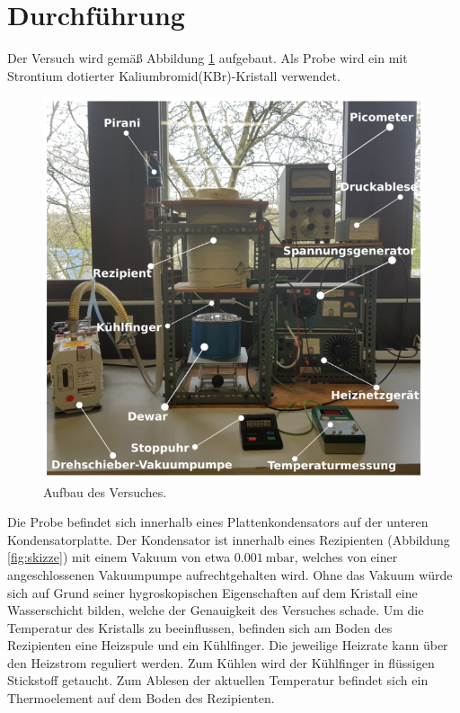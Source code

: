 \section{Durchführung}
\label{sec:Durchführung}

Der Versuch wird gemäß Abbildung \ref{fig:aufbau} aufgebaut. Als Probe wird ein mit Strontium dotierter Kaliumbromid(KBr)-Kristall verwendet.

\begin{figure}
    \centering
    \includegraphics[width=\textwidth]{Bilder/Aufbau.PNG}
    \caption{Aufbau des Versuches.}
    \label{fig:aufbau}
\end{figure}

Die Probe befindet sich innerhalb eines Plattenkondensators auf der unteren Kondensatorplatte. Der Kondensator ist innerhalb eines Rezipienten (Abbildung \ref{fig:skizze}) mit einem Vakuum von etwa $\SI{0.001}{\milli\bar}$, welches von einer angeschlossenen Vakuumpumpe aufrechtgehalten wird. Ohne das Vakuum würde sich auf Grund seiner hygroskopischen Eigenschaften auf dem Kristall eine Wasserschicht bilden, welche der Genauigkeit des Versuches schade.
Um die Temperatur des Kristalls zu beeinflussen, befinden sich am Boden des Rezipienten eine Heizspule und ein Kühlfinger. Die jeweilige Heizrate kann über den Heizstrom reguliert werden. Zum Kühlen wird der Kühlfinger in flüssigen Stickstoff getaucht. Zum Ablesen der aktuellen Temperatur befindet sich ein Thermoelement auf dem Boden des Rezipienten. 


